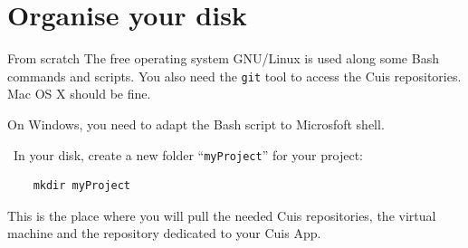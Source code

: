 \documentclass{beamer}
\newcommand{\tip}{\boldmath{\textcolor{red}{$\Rightarrow$}}}
\begin{document}
\section{Organise your disk}
\begin{frame}[fragile]{From scratch}
  The free operating system GNU/Linux is used along some Bash commands
  and scripts. You also need the \texttt{git} tool to access the Cuis
  repositories. Mac OS X should be fine.

  On Windows, you need to adapt the Bash script to Microsfoft shell.

\vspace{10pt}
  
  \tip\ In your disk, create a new folder ``\texttt{myProject}'' for
  your project:
\begin{verbatim}
    mkdir myProject
\end{verbatim}

  This is the place where you will pull the needed Cuis repositories,
  the virtual machine and the repository dedicated to your Cuis App.
\end{frame}
\end{document}
